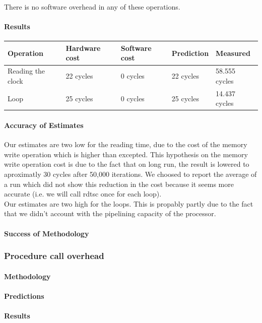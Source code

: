 There is no software overhead in any of these operations.

\paragraph{Results}

\begin{tabular}{| l | l | l | l | l |}
\hline
Operation & Hardware cost & Software cost & Prediction & Measured \\
\hline
Reading the clock & 22 cycles & 0 cycles & 22 cycles & 58.555 cycles \\
\hline
Loop & 25 cycles & 0 cycles & 25 cycles & 14.437 cycles \\
\hline
\end{tabular}
\paragraph{Accuracy of Estimates}
Our estimates are two low for the reading time, due to the cost of the memory write operation which is
higher than excepted.
This hypothesis on the memory write operation cost is due to the fact that on long run,
the result is lowered to aproximatly 30 cycles after 50,000 iterations.
We choosed to report the average of a run which did not show this reduction in
the cost because it seems more accurate (i.e. we will call rdtsc once for each
loop).\\

Our estimates are two high for the loops.
This is propably partly due to the fact that we didn't account with the pipelining
capacity of the processor.

\paragraph{Success of Methodology}

\subsubsection{Procedure call overhead}
\paragraph{Methodology}
\paragraph{Predictions}
\paragraph{Results}

